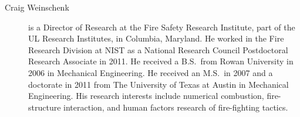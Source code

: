 \begin{description}


\item[Craig Weinschenk] is a Director of Research at the Fire Safety Research Institute, part of the UL Research Institutes, in Columbia, Maryland. He worked in the Fire Research Division at NIST as a National Research Council Postdoctoral Research Associate in 2011. He received a B.S.~from Rowan University in 2006 in Mechanical Engineering. He received an M.S.~in 2007 and a doctorate in 2011 from The University of Texas at Austin in Mechanical Engineering. His research interests include numerical combustion, fire-structure interaction, and human factors research of fire-fighting tactics.

\end{description}


